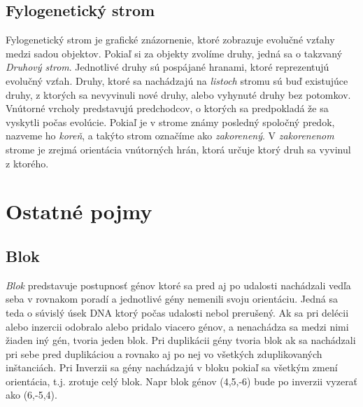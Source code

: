 \subsection{Fylogenetický strom}
Fylogenetický strom je grafické znázornenie, ktoré zobrazuje evolučné vzťahy medzi sadou objektov. Pokiaľ si za objekty zvolíme druhy, jedná sa o takzvaný \emph{Druhový strom}.
Jednotlivé druhy sú pospájané hranami, ktoré reprezentujú evolučný vzťah.
\newline 
Druhy, ktoré sa nachádzajú na \emph{listoch} stromu sú buď existujúce druhy, z ktorých sa nevyvinuli nové druhy, alebo vyhynuté druhy bez potomkov.  
\newline
Vnútorné vrcholy predstavujú predchodcov, o ktorých sa predpokladá že sa vyskytli počas evolúcie.
\newline
Pokiaľ je v strome známy posledný spoločný predok, nazveme ho \emph{koreň}, a takýto strom označíme ako \emph{zakorenený}.
\newline
V \emph{zakorenenom} strome je zrejmá orientácia vnútorných hrán, ktorá určuje ktorý druh sa vyvinul z ktorého.
\section{Ostatné pojmy}
\subsection{Blok}
\emph{Blok} predstavuje postupnosť génov ktoré sa pred aj po udalosti nachádzali vedľa seba v rovnakom poradí a jednotlivé gény nemenili svoju orientáciu. Jedná sa teda o súvislý
úsek DNA ktorý počas udalosti nebol prerušený.
Ak sa pri delécii alebo inzercii odobralo alebo pridalo viacero génov, a nenachádza sa medzi nimi žiaden iný gén, tvoria jeden blok.
Pri duplikácii gény tvoria blok ak sa nachádzali pri sebe pred duplikáciou a rovnako aj po nej vo všetkých zduplikovaných inštanciách.
Pri Inverzii sa gény nachádzajú v bloku pokiaľ sa všetkým zmení orientácia, t.j. zrotuje celý blok.
Napr blok génov (4,5,-6) bude po inverzii vyzerať ako (6,-5,4).